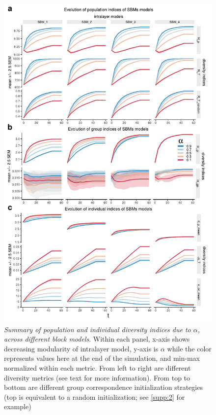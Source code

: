 \begin{figure}[!ht]
    \centering
    \includegraphics[width=\textwidth]{figures/FigS3.pdf}
    \caption{\label{fig:6}
    \textit{Summary  of  population  and  individual  diversity  indices  due  to $\alpha$,  across  different  block  models}. Within each panel, x-axis shows decreasing modularity of intralayer model, y-axis is $\alpha$ while the color represents values here at the end of the simulation, and min-max normalized within each metric. From left to right are different diversity metrics (see text for more information). From top to bottom are different group correspondence initialization strategies (top is equivalent to a random initialization; see \ref{supp:2} for example)
    }
\end{figure}